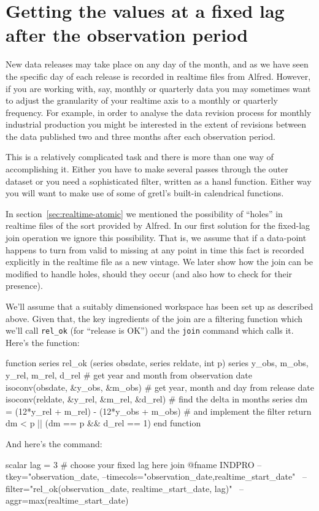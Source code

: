 \section{Getting the values at a fixed lag after the observation
  period}
\label{sec:realtime-fixed-lag}

New data releases may take place on any day of the month, and as we
have seen the specific day of each release is recorded in realtime
files from Alfred. However, if you are working with, say, monthly or
quarterly data you may sometimes want to adjust the granularity of
your realtime axis to a monthly or quarterly frequency. For example,
in order to analyse the data revision process for monthly industrial
production you might be interested in the extent of revisions between
the data published two and three months after each observation period.

This is a relatively complicated task and there is more than one way
of accomplishing it. Either you have to make several passes through
the outer dataset or you need a sophisticated filter, written as a
hansl function. Either way you will want to make use of some of
gretl's built-in calendrical functions.

In section~\ref{sec:realtime-atomic} we mentioned the possibility of
``holes'' in realtime files of the sort provided by Alfred. In our
first solution for the fixed-lag join operation we ignore this
possibility. That is, we assume that if a data-point happens to turn
from valid to missing at any point in time this fact is recorded
explicitly in the realtime file as a new vintage. We later show how
the join can be modified to handle holes, should they occur (and also
how to check for their presence).

We'll assume that a suitably dimensioned workspace has been set up as
described above. Given that, the key ingredients of the join are a
filtering function which we'll call \verb|rel_ok| (for ``release is
OK'') and the \texttt{join} command which calls it. Here's the
function:
%
\begin{code}
function series rel_ok (series obsdate, series reldate, int p)
  series y_obs, m_obs, y_rel, m_rel, d_rel
  # get year and month from observation date
  isoconv(obsdate, &y_obs, &m_obs)
  # get year, month and day from release date
  isoconv(reldate, &y_rel, &m_rel, &d_rel)
  # find the delta in months
  series dm = (12*y_rel + m_rel) - (12*y_obs + m_obs)
  # and implement the filter
  return dm < p || (dm == p && d_rel == 1)
end function
\end{code}
%
And here's the command:
%
\begin{code}
scalar lag = 3  # choose your fixed lag here
join @fname INDPRO --tkey="observation_date,%
--timecols="observation_date,realtime_start_date" \
--filter="rel_ok(observation_date, realtime_start_date, lag)" \
--aggr=max(realtime_start_date)
\end{code}

